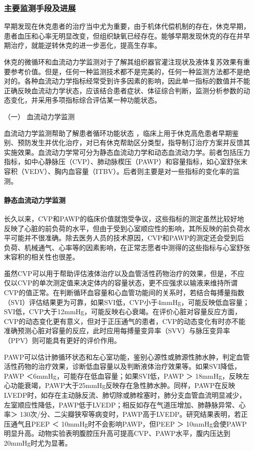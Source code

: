\subsubsection{主要监测手段及进展}

早期发现在休克患者的治疗当中尤为重要，由于机体代偿机制的存在，休克早期，患者血压和心率无明显改变，但组织缺氧已经存在。能够早期发现休克的存在并早期治疗，就能逆转休克的进一步恶化，提高生存率。

休克的微循环和血流动力学监测对于了解其组织器官灌注现状及液体复苏效果有重要参考价值。但是，任何一种监测技术都不是完美的，任何一种监测方法都不是绝对的。各种血流动力学指标经常受到许多因素的影响，因此单一指标的数值并不能正确反映血流动力学状态，应该结合患者症状、体征综合判断，监测分析参数的动态变化，并采用多项指标综合评估某一种功能状态。

\hypertarget{text00055.htmlux5cux23CHP2-1-2-4-1}{}
（一） 血流动力学监测

血流动力学监测帮助了解患者循环功能状态
，临床上用于休克高危患者早期鉴别、预防发生并优化治疗，对已有休克帮助区分类型，指导制订治疗方案并反馈其实施效果。血流动力学常可分为静态血流动力学和动态血流动力学。前者包括压力指标，如中心静脉压（CVP）、肺动脉楔压（PAWP）和容量指标，如心室舒张末容积（VEDV）、胸内血容量（ITBV）。后者则主要是对一些指标的变化率的监测。

\paragraph{静态血流动力学监测}

长久以来，CVP和PAWP的临床价值就饱受争议，这些指标的测定虽然比较好地反映了心脏的前负荷的水平，但由于受到心室顺应性的影响，其所反映的前负荷水平可能并不很准确。除去医务人员的技术原因，CVP和PAWP的测定还会受到后负荷、机械通气、心率等的因素影响，在正常志愿者中测得的这些指标与心室舒张末容积的相关性也很差。

虽然CVP可以用于帮助评估液体治疗以及血管活性药物治疗的效果，但是，不应仅以CVP的单次测定值来决定体内的容量状态，更不应强求以输液来维持所谓CVP的值正常。在判断循环血容量和心血管功能间的关系时，若结合每搏量指数（SVI）评估结果更为可靠，如果SVI低，CVP小于4mmHg，可能反映低血容量；SVI低，CVP大于12mmHg，可能反映右心衰竭。在评价心脏对容量反应方面，CVP的动态变化更有意义，但对于正压通气的患者，CVP的动态变化有时亦不能准确预测心脏对容量的反应，此时应用每搏量变异率（SVV）与脉压变异率（PPV）则可能具有更好的评价作用。

PAWP可以估计肺循环状态和左心室功能，鉴别心源性或肺源性肺水肿，判定血管活性药物的治疗效果，诊断低血容量以及判断液体治疗效果等。如果SVI降低，PAWP
＜6mmHg，可能存在低血容量；如果SVI低，PAWP ＞
18mmHg，反映左心功能衰竭，PAWP大于25mmHg反映存在急性肺水肿。同样，PAWP在反映LVEDP时，如存在主动脉反流、肺切除或肺栓塞时，肺分支血管血流明显减少，左室顺应性降低，PAWP低于LVEDP；相反如存在气道压增加、肺静脉异常、心率＞
130次/分、二尖瓣狭窄等病变时，PAWP高于LVEDP。研究结果表明，若正压通气且PEEP
＜ 10mmHg时不会影响PAWP，但PEEP ＞
10mmHg会使PAWP明显升高。动物实验表明腹腔压升高可提高CVP、PAWP水平，腹内压达到20mmHg时尤为显著。

